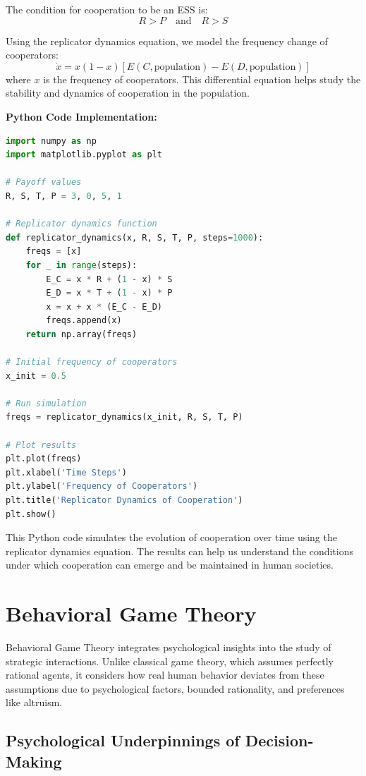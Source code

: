 \documentclass[12pt]{book} %
\begin{document}
The condition for cooperation to be an ESS is:
\[
R > P \quad \text{and} \quad R > S
\]

Using the replicator dynamics equation, we model the frequency change of cooperators:
\[
\dot{x} = x (1 - x) \left[ E(C, \text{population}) - E(D, \text{population}) \right]
\]
where \( x \) is the frequency of cooperators. This differential equation helps study the stability and dynamics of cooperation in the population.

\FloatBarrier
\textbf{Python Code Implementation:}
\FloatBarrier
\begin{lstlisting}[language=Python, caption=Replicator Dynamics Simulation]
import numpy as np
import matplotlib.pyplot as plt

# Payoff values
R, S, T, P = 3, 0, 5, 1

# Replicator dynamics function
def replicator_dynamics(x, R, S, T, P, steps=1000):
    freqs = [x]
    for _ in range(steps):
        E_C = x * R + (1 - x) * S
        E_D = x * T + (1 - x) * P
        x = x + x * (E_C - E_D)
        freqs.append(x)
    return np.array(freqs)

# Initial frequency of cooperators
x_init = 0.5

# Run simulation
freqs = replicator_dynamics(x_init, R, S, T, P)

# Plot results
plt.plot(freqs)
plt.xlabel('Time Steps')
plt.ylabel('Frequency of Cooperators')
plt.title('Replicator Dynamics of Cooperation')
plt.show()
\end{lstlisting}
\FloatBarrier

This Python code simulates the evolution of cooperation over time using the replicator dynamics equation. The results can help us understand the conditions under which cooperation can emerge and be maintained in human societies.


\section{Behavioral Game Theory}

Behavioral Game Theory integrates psychological insights into the study of strategic interactions. Unlike classical game theory, which assumes perfectly rational agents, it considers how real human behavior deviates from these assumptions due to psychological factors, bounded rationality, and preferences like altruism.

\subsection{Psychological Underpinnings of Decision-Making}
\end{document}
